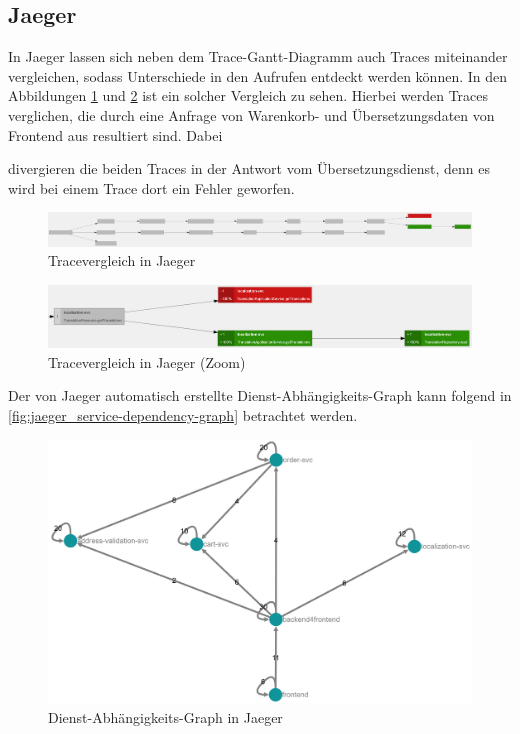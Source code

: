 \subsection{Jaeger}
\label{sec:demo-jaeger}

In Jaeger lassen sich neben dem Trace-Gantt-Diagramm auch Traces miteinander vergleichen, sodass Unterschiede in den Aufrufen entdeckt werden können. In den Abbildungen \ref*{fig:jaeger_comparison-all} und \ref*{fig:jaeger_comparison-zoom} ist ein solcher Vergleich zu sehen. Hierbei werden Traces verglichen, die durch eine Anfrage von Warenkorb- und Übersetzungsdaten von Frontend aus resultiert sind. Dabei

 divergieren die beiden Traces in der Antwort vom Übersetzungsdienst, denn es wird bei einem Trace dort ein Fehler geworfen.

\begin{figure}[H]
	\centering
	\includegraphics[width=1.00\linewidth]{img/99_postscript/jaeger_comparison-all.png}
	\caption{Tracevergleich in Jaeger}
	\label{fig:jaeger_comparison-all}
\end{figure}

\begin{figure}[H]
	\centering
	\includegraphics[width=1.00\linewidth]{img/99_postscript/jaeger_comparison-zoom.png}
	\caption{Tracevergleich in Jaeger (Zoom)}
	\label{fig:jaeger_comparison-zoom}
\end{figure}

Der von Jaeger automatisch erstellte Dienst-Abhängigkeits-Graph kann folgend in \autoref{fig:jaeger_service-dependency-graph} betrachtet werden.

\begin{figure}[H]
	\centering
	\includegraphics[width=0.7\linewidth]{img/99_postscript/jaeger_service-dependency-graph.png}
	\caption{Dienst-Abhängigkeits-Graph in Jaeger}
	\label{fig:jaeger_service-dependency-graph}
\end{figure}